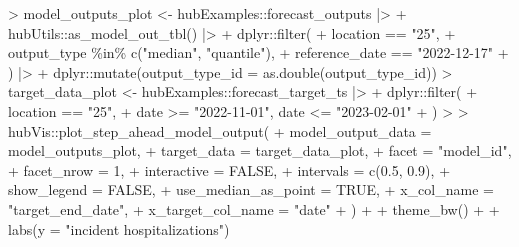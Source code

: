 \documentclass[
  letterpaper,
  DIV=11,
  numbers=noendperiod]{scrartcl}
\newenvironment{Shaded}{\begin{snugshade}}{\end{snugshade}}
\newcommand{\AttributeTok}[1]{\textcolor[rgb]{0.40,0.45,0.13}{#1}}
\newcommand{\ConstantTok}[1]{\textcolor[rgb]{0.56,0.35,0.01}{#1}}
\newcommand{\DecValTok}[1]{\textcolor[rgb]{0.68,0.00,0.00}{#1}}
\newcommand{\ErrorTok}[1]{\textcolor[rgb]{0.68,0.00,0.00}{#1}}
\newcommand{\FloatTok}[1]{\textcolor[rgb]{0.68,0.00,0.00}{#1}}
\newcommand{\FunctionTok}[1]{\textcolor[rgb]{0.28,0.35,0.67}{#1}}
\newcommand{\NormalTok}[1]{\textcolor[rgb]{0.00,0.23,0.31}{#1}}
\newcommand{\OtherTok}[1]{\textcolor[rgb]{0.00,0.23,0.31}{#1}}
\newcommand{\SpecialCharTok}[1]{\textcolor[rgb]{0.37,0.37,0.37}{#1}}
\newcommand{\StringTok}[1]{\textcolor[rgb]{0.13,0.47,0.30}{#1}}
\begin{document}
\begin{Shaded}
\begin{Highlighting}[]
\SpecialCharTok{\textgreater{}}\NormalTok{ model\_outputs\_plot }\OtherTok{\textless{}{-}}\NormalTok{ hubExamples}\SpecialCharTok{::}\NormalTok{forecast\_outputs }\SpecialCharTok{|\textgreater{}}
\SpecialCharTok{+}\NormalTok{     hubUtils}\SpecialCharTok{::}\FunctionTok{as\_model\_out\_tbl}\NormalTok{() }\SpecialCharTok{|\textgreater{}}
\SpecialCharTok{+}\NormalTok{     dplyr}\SpecialCharTok{::}\FunctionTok{filter}\NormalTok{(}
\SpecialCharTok{+}\NormalTok{       location }\SpecialCharTok{==} \StringTok{"25"}\NormalTok{,}
\SpecialCharTok{+}\NormalTok{       output\_type }\SpecialCharTok{\%in\%} \FunctionTok{c}\NormalTok{(}\StringTok{"median"}\NormalTok{, }\StringTok{"quantile"}\NormalTok{),}
\SpecialCharTok{+}\NormalTok{       reference\_date }\SpecialCharTok{==} \StringTok{"2022{-}12{-}17"}
\SpecialCharTok{+}\NormalTok{     ) }\SpecialCharTok{|\textgreater{}}
\SpecialCharTok{+}\NormalTok{   dplyr}\SpecialCharTok{::}\FunctionTok{mutate}\NormalTok{(}\AttributeTok{output\_type\_id =} \FunctionTok{as.double}\NormalTok{(output\_type\_id))}
\SpecialCharTok{\textgreater{}}\NormalTok{ target\_data\_plot }\OtherTok{\textless{}{-}}\NormalTok{ hubExamples}\SpecialCharTok{::}\NormalTok{forecast\_target\_ts }\SpecialCharTok{|\textgreater{}}
\SpecialCharTok{+}\NormalTok{     dplyr}\SpecialCharTok{::}\FunctionTok{filter}\NormalTok{(}
\SpecialCharTok{+}\NormalTok{       location }\SpecialCharTok{==} \StringTok{"25"}\NormalTok{,}
\SpecialCharTok{+}\NormalTok{       date }\SpecialCharTok{\textgreater{}=} \StringTok{"2022{-}11{-}01"}\NormalTok{, date }\SpecialCharTok{\textless{}=} \StringTok{"2023{-}02{-}01"}
\SpecialCharTok{+}\NormalTok{     )}
\SpecialCharTok{\textgreater{}} 
\ErrorTok{\textgreater{}}\NormalTok{ hubVis}\SpecialCharTok{::}\FunctionTok{plot\_step\_ahead\_model\_output}\NormalTok{(}
\SpecialCharTok{+}     \AttributeTok{model\_output\_data =}\NormalTok{ model\_outputs\_plot,}
\SpecialCharTok{+}     \AttributeTok{target\_data =}\NormalTok{ target\_data\_plot,}
\SpecialCharTok{+}     \AttributeTok{facet =} \StringTok{"model\_id"}\NormalTok{,}
\SpecialCharTok{+}     \AttributeTok{facet\_nrow =} \DecValTok{1}\NormalTok{,}
\SpecialCharTok{+}     \AttributeTok{interactive =} \ConstantTok{FALSE}\NormalTok{,}
\SpecialCharTok{+}     \AttributeTok{intervals =} \FunctionTok{c}\NormalTok{(}\FloatTok{0.5}\NormalTok{, }\FloatTok{0.9}\NormalTok{),}
\SpecialCharTok{+}     \AttributeTok{show\_legend =} \ConstantTok{FALSE}\NormalTok{,}
\SpecialCharTok{+}     \AttributeTok{use\_median\_as\_point =} \ConstantTok{TRUE}\NormalTok{,}
\SpecialCharTok{+}     \AttributeTok{x\_col\_name =} \StringTok{"target\_end\_date"}\NormalTok{, }
\SpecialCharTok{+}     \AttributeTok{x\_target\_col\_name =} \StringTok{"date"}
\SpecialCharTok{+}\NormalTok{   ) }\SpecialCharTok{+}
\SpecialCharTok{+}     \FunctionTok{theme\_bw}\NormalTok{() }\SpecialCharTok{+}
\SpecialCharTok{+}     \FunctionTok{labs}\NormalTok{(}\AttributeTok{y =} \StringTok{"incident hospitalizations"}\NormalTok{)}
\end{Highlighting}
\end{Shaded}
\end{document}
